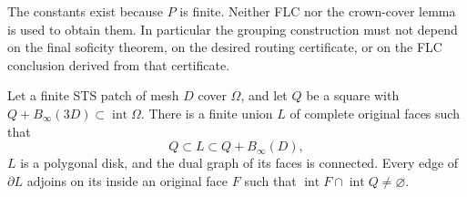The constants exist because $P$ is finite.  Neither FLC nor the crown-cover
lemma is used to obtain them.  In particular the grouping construction must
not depend on the final soficity theorem, on the desired routing certificate,
or on the FLC conclusion derived from that certificate.

\begin{lemma}
\label{lem:regular-grouping}
Let a finite STS patch of mesh $D$ cover $\Omega$, and let $Q$ be a square
with $Q+B_\infty(3D)\subset\operatorname{int}\Omega$.  There is a finite
union $L$ of complete original faces such that
\[
 Q\subset L\subset Q+B_\infty(D),
\]
$L$ is a polygonal disk, and the dual graph of its faces is connected.
Every edge of $\partial L$ adjoins on its inside an original face $F$ such
that $\operatorname{int}F\cap\operatorname{int}Q\ne\varnothing$.
\end{lemma}

